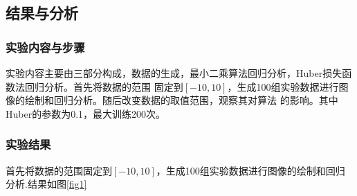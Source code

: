 \documentclass[final]{cvpr}
\begin{document}
\subsection{结果与分析}
\subsubsection{实验内容与步骤}
实验内容主要由三部分构成，数据的生成，最小二乘算法回归分析，Huber损失函数法回归分析。首先将数据的范围
固定到$[-10,10]$，生成100组实验数据进行图像的绘制和回归分析。随后改变数据的取值范围，观察其对算法
的影响。其中Huber的参数为0.1，最大训练200次。
\subsubsection{实验结果}
首先将数据的范围固定到$[-10,10]$，生成100组实验数据进行图像的绘制和回归分析.结果如图\ref{fig1}\par
\end{document}
